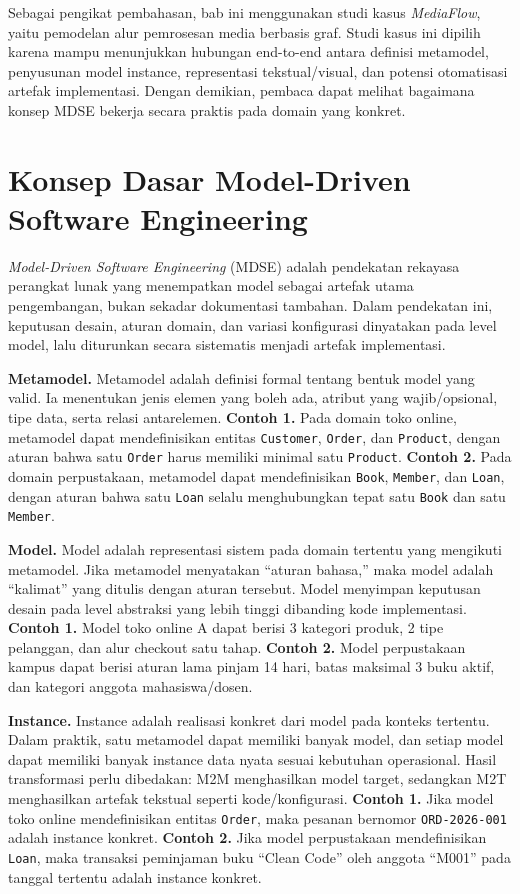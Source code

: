Sebagai pengikat pembahasan, bab ini menggunakan studi kasus \textit{MediaFlow}, yaitu pemodelan alur pemrosesan media berbasis graf. Studi kasus ini dipilih karena mampu menunjukkan hubungan end-to-end antara definisi metamodel, penyusunan model instance, representasi tekstual/visual, dan potensi otomatisasi artefak implementasi. Dengan demikian, pembaca dapat melihat bagaimana konsep MDSE bekerja secara praktis pada domain yang konkret.

\section{Konsep Dasar Model-Driven Software Engineering}

\textit{Model-Driven Software Engineering} (MDSE) adalah pendekatan rekayasa perangkat lunak yang menempatkan model sebagai artefak utama pengembangan, bukan sekadar dokumentasi tambahan. Dalam pendekatan ini, keputusan desain, aturan domain, dan variasi konfigurasi dinyatakan pada level model, lalu diturunkan secara sistematis menjadi artefak implementasi.

\textbf{Metamodel.} Metamodel adalah definisi formal tentang bentuk model yang valid. Ia menentukan jenis elemen yang boleh ada, atribut yang wajib/opsional, tipe data, serta relasi antarelemen. \textbf{Contoh 1.} Pada domain toko online, metamodel dapat mendefinisikan entitas \texttt{Customer}, \texttt{Order}, dan \texttt{Product}, dengan aturan bahwa satu \texttt{Order} harus memiliki minimal satu \texttt{Product}. \textbf{Contoh 2.} Pada domain perpustakaan, metamodel dapat mendefinisikan \texttt{Book}, \texttt{Member}, dan \texttt{Loan}, dengan aturan bahwa satu \texttt{Loan} selalu menghubungkan tepat satu \texttt{Book} dan satu \texttt{Member}.

\textbf{Model.} Model adalah representasi sistem pada domain tertentu yang mengikuti metamodel. Jika metamodel menyatakan ``aturan bahasa,'' maka model adalah ``kalimat'' yang ditulis dengan aturan tersebut. Model menyimpan keputusan desain pada level abstraksi yang lebih tinggi dibanding kode implementasi. \textbf{Contoh 1.} Model toko online A dapat berisi 3 kategori produk, 2 tipe pelanggan, dan alur checkout satu tahap. \textbf{Contoh 2.} Model perpustakaan kampus dapat berisi aturan lama pinjam 14 hari, batas maksimal 3 buku aktif, dan kategori anggota mahasiswa/dosen.

\textbf{Instance.} Instance adalah realisasi konkret dari model pada konteks tertentu. Dalam praktik, satu metamodel dapat memiliki banyak model, dan setiap model dapat memiliki banyak instance data nyata sesuai kebutuhan operasional. Hasil transformasi perlu dibedakan: M2M menghasilkan model target, sedangkan M2T menghasilkan artefak tekstual seperti kode/konfigurasi. \textbf{Contoh 1.} Jika model toko online mendefinisikan entitas \texttt{Order}, maka pesanan bernomor \texttt{ORD-2026-001} adalah instance konkret. \textbf{Contoh 2.} Jika model perpustakaan mendefinisikan \texttt{Loan}, maka transaksi peminjaman buku ``Clean Code'' oleh anggota ``M001'' pada tanggal tertentu adalah instance konkret.

